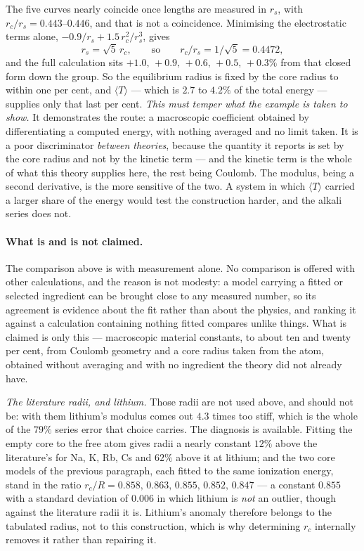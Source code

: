\documentclass[11pt]{article}
\begin{document}
\noindent The five curves nearly coincide once lengths are measured in $r_s$, with
$r_c/r_s=0.443$--$0.446$, and that is not a coincidence. Minimising the electrostatic terms alone,
$-0.9/r_s + 1.5\,r_c^2/r_s^3$, gives
\[
  r_s=\sqrt5\,r_c,\qquad\text{so}\qquad r_c/r_s = 1/\sqrt5 = 0.4472 ,
\]
and the full calculation sits $+1.0,\,+0.9,\,+0.6,\,+0.5,\,+0.3\%$ from that closed form down the
group. So the equilibrium radius is fixed by the core radius to within one per cent, and
$\langle T\rangle$ --- which is $2.7$ to $4.2\%$ of the total energy --- supplies only that last per
cent. \emph{This must temper what the example is taken to show.} It demonstrates the route: a
macroscopic coefficient obtained by differentiating a computed energy, with nothing averaged and no
limit taken. It is a poor discriminator \emph{between theories}, because the quantity it reports is
set by the core radius and not by the kinetic term --- and the kinetic term is the whole of what
this theory supplies here, the rest being Coulomb. The modulus, being a second derivative, is the
more sensitive of the two. A system in which $\langle T\rangle$ carried a larger share of the energy
would test the construction harder, and the alkali series does not.

\paragraph{What is and is not claimed.} The comparison above is with measurement alone. No
comparison is offered with other calculations, and the reason is not modesty: a model carrying a
fitted or selected ingredient can be brought close to any measured number, so its agreement is
evidence about the fit rather than about the physics, and ranking it against a calculation
containing nothing fitted compares unlike things. What is claimed is only this --- macroscopic
material constants, to about ten and twenty per cent, from Coulomb geometry and a core radius taken
from the atom, obtained without averaging and with no ingredient the theory did not already have.

\emph{The literature radii, and lithium.} Those radii are not used above, and should not be: with
them lithium's modulus comes out $4.3$ times too stiff, which is the whole of the $79\%$ series
error that choice carries. The diagnosis is available. Fitting the empty core to the free atom gives
radii a nearly constant $12\%$ above the literature's for Na, K, Rb, Cs and $62\%$ above it at
lithium; and the two core models of the previous paragraph, each fitted to the same ionization
energy, stand in the ratio $r_c/R = 0.858,\,0.863,\,0.855,\,0.852,\,0.847$ --- a constant $0.855$
with a standard deviation of $0.006$ in which lithium is \emph{not} an outlier, though against the
literature radii it is. Lithium's anomaly therefore belongs to the tabulated radius, not to this
construction, which is why determining $r_c$ internally removes it rather than repairing it.
\end{document}
